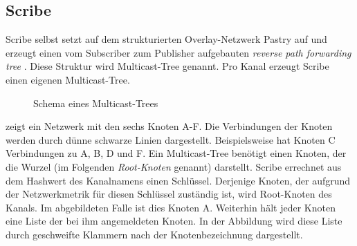 \subsection{Scribe}
\label{chap:related:scribe}
Scribe \cite{Castro2002Scribe} selbst setzt auf dem strukturierten Overlay-Netzwerk Pastry \cite{Rowstron2001} auf und erzeugt einen vom Subscriber zum Publisher aufgebauten \emph{reverse path forwarding tree} \cite{Dalal1978}. Diese Struktur wird Multicast-Tree genannt. Pro Kanal erzeugt Scribe einen eigenen Multicast-Tree.

\begin{figure}[htbp]
\centering
{}
\caption{Schema eines Multicast-Trees}
\label{fig:multicast_tree}
\end{figure}

 zeigt ein Netzwerk mit den sechs Knoten A-F. Die Verbindungen der Knoten werden durch dünne schwarze Linien dargestellt. Beispielsweise hat Knoten C Verbindungen zu A, B, D und F. Ein Multicast-Tree benötigt einen Knoten, der die Wurzel (im Folgenden \emph{Root-Knoten} genannt) darstellt. Scribe errechnet aus dem Hashwert des Kanalnamens einen Schlüssel. Derjenige Knoten, der aufgrund der Netzwerkmetrik für diesen Schlüssel zuständig ist, wird Root-Knoten des Kanals. Im abgebildeten Falle ist dies Knoten A. Weiterhin hält jeder Knoten eine Liste der bei ihm angemeldeten Knoten. In der Abbildung wird diese Liste durch geschweifte Klammern nach der Knotenbezeichnung dargestellt.

